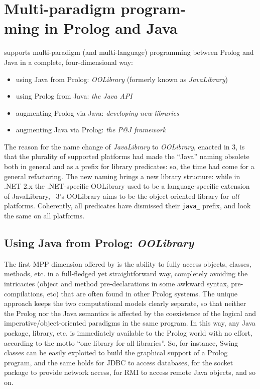 \chapter[Multi-paradigm programming in Prolog and Java]{Multi-paradigm program-\\ming in Prolog and Java}
\label{ch:mpp-in-java}

\tuprolog{} supports multi-paradigm (and multi-language) programming between Prolog and Java in a complete, four-dimensional way:

\begin{itemize}
  \item using Java from Prolog: \textit{OOLibrary} (formerly known as \textit{JavaLibrary})
  \item using Prolog from Java: \textit{the Java API}
  \item augmenting Prolog via Java: \textit{developing new libraries}
  \item augmenting Java via Prolog: \textit{the P@J framework}
\end{itemize}

The reason for the name change of \textit{JavaLibrary} to \textit{OOLibrary}, enacted in \tuprolog{} 3, is that the plurality of supported platforms had made the ``Java'' naming obsolete both in general and as a prefix for library predicates: so, the time had come for a general refactoring.
The new naming brings a new library structure: while in \tuprolog{}.NET 2.x the .NET-specific OOLibrary used to be a language-specific extension of JavaLibrary, \tuprolog{}~3's OOLibrary aims to be the object-oriented library for \textit{all} platforms.
Coherently, all predicates have dismissed their \texttt{java\_} prefix, and look the same on all platforms.

\section{Using Java from Prolog: \textit{OOLibrary}}
\label{sec:java-library}
The first MPP dimension offered by \tuprolog{} is the ability to fully access objects, classes, methods, etc. in a full-fledged yet straightforward way, completely avoiding the intricacies (object and method pre-declarations in some awkward syntax, pre-compilations, etc) that are often found in other Prolog systems.
%
The unique \tuprolog{} approach keeps the two computational models clearly separate, so that neither the Prolog nor the Java semantics is affected by the coexistence of the logical and imperative/object-oriented paradigms in the same program.
%
In this way, any Java package, library, etc. is immediately available to the Prolog world with no effort, according to the motto {``one library for all libraries''}. So, for instance, Swing classes can be easily exploited to build the graphical support of a Prolog program, and the same holds for JDBC to access databases, for the socket package to provide network access, for RMI to access remote Java objects, and so on.

